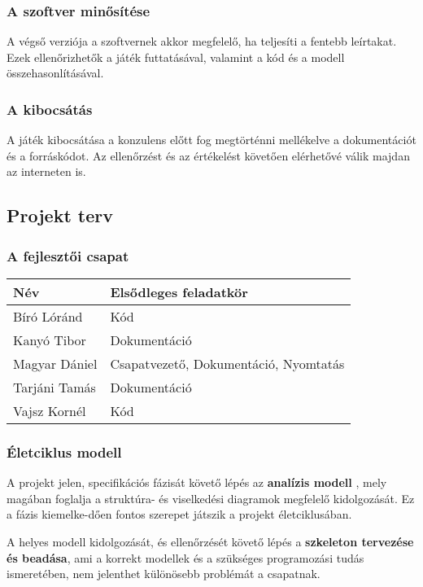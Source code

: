 \subsubsection{A szoftver minősítése}

A végső verziója a szoftvernek akkor megfelelő, ha teljesíti a fentebb leírtakat. Ezek ellenőrizhetők a játék futtatásával, valamint a kód és a modell összehasonlításával.

\subsubsection{A kibocsátás}

A játék kibocsátása a konzulens előtt fog megtörténni mellékelve a dokumentációt és a forráskódot. Az ellenőrzést és az értékelést követően elérhetővé válik majdan az interneten is.

\subsection{Projekt terv}

\subsubsection{A fejlesztői csapat}
\begin{tabular}{|l|l|}
\hline 
\textbf{Név} & \textbf{Elsődleges feladatkör} \\ 
\hline 
Bíró Lóránd & Kód \\ 
\hline 
Kanyó Tibor & Dokumentáció \\ 
\hline 
Magyar Dániel & Csapatvezető, Dokumentáció, Nyomtatás \\ 
\hline 
Tarjáni Tamás & Dokumentáció \\ 
\hline 
Vajsz Kornél & Kód \\ 
\hline 
\end{tabular} 

\subsubsection{Életciklus modell}
	A projekt jelen, specifikációs fázisát követő lépés az \textbf{analízis modell }, mely magában foglalja a struktúra- és viselkedési diagramok megfelelő kidolgozását. Ez a fázis kiemelke-dően fontos szerepet játszik a projekt életciklusában. 

	A helyes modell kidolgozását, és ellenőrzését követő lépés a \textbf{szkeleton tervezése és beadása}, ami a korrekt modellek és a szükséges programozási tudás ismeretében, nem jelenthet különösebb problémát a csapatnak.
	

